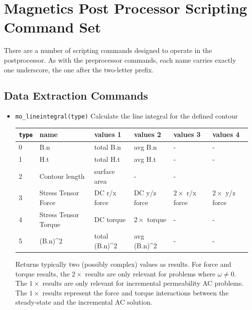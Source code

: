 \section{Magnetics Post Processor Scripting Command Set}

There are a number of scripting commands designed to operate in
the postprocessor.  As with the preprocessor commands, each name
carries exactly one underscore, the one after the two-letter prefix.

\subsection{Data Extraction Commands}

\begin{itemize}
\item{\tt mo\_lineintegral(type)} Calculate the line integral for the defined contour
\begin{small}\begin{center}
\begin{tabular}{llllll}\hline
 {\tt type} & name & values 1 & values 2 & values 3 & values 4 \\  \hline
 0 & B.n & total B.n & avg B.n & - & -\\
 1 & H.t & total H.t & avg H.t & - & - \\
 2 & Contour length & surface area & - & -\\
 3 & Stress Tensor Force & DC r/x force & DC y/z force & $2\times$ r/x force & $2\times$ y/z force \\
 4 & Stress Tensor Torque& DC torque & $2\times$ torque & - & - \\
 5 & (B.n)\^{}2 & total (B.n)\^{}2 & avg (B.n)\^{}2 & - & - \\ \hline
\end{tabular}
\end{center}
\end{small}
Returns typically two (possibly complex) values as results. For force
and torque results, the $2\times$ results are only relevant for
problems where $\omega \neq 0$.  The $1\times$ results are only relevant
for incremental permeability AC problems.  The $1\times$ results represent
the force and torque interactions between the steady-state and the
incremental AC solution.


\end{itemize}
